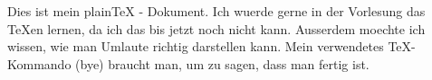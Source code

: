 Dies ist mein plainTeX - Dokument. Ich wuerde gerne in der Vorlesung das TeXen lernen, da ich das bis jetzt noch nicht kann.
Ausserdem moechte ich wissen, wie man Umlaute richtig darstellen kann.
Mein verwendetes TeX-Kommando (bye) braucht man, um zu sagen, dass man fertig ist.

\bye